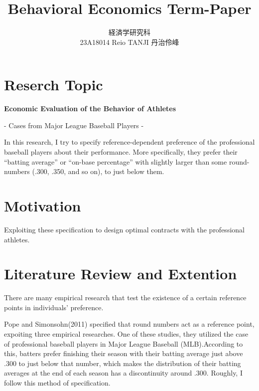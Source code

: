 \documentclass{jsarticle}[12pt]
\begin{document}
\title{Behavioral Economics Term-Paper}
\author{経済学研究科　 \\ 23A18014 Reio TANJI 丹治伶峰}
\date{}
\maketitle

\section{Reserch Topic}

\Large

\textbf{Economic Evaluation of the Behavior of Athletes}

\hspace{5zw}- Cases from Major League Baseball Players -

\large

\vspace{1zw}

\hspace{1zw}In this research, I try to specify reference-dependent preference of the professional baseball players about their performance. More specifically, they prefer their ``batting average'' or ``on-base percentage'' with slightly larger than some round-numbers (.300, .350, and so on), to just below them.

\section{Motivation}

Exploiting these specification to design optimal contracts with the professional athletes.

\section{Literature Review and Extention}

\hspace{1zw} There are many empirical research that test the existence of a certain reference points in individuals' preference.

\hspace{1zw} Pope and Simonsohn(2011) specified that round numbers act as a reference point, expoiting three empirical researches. One of these studies, they utilized the case of professional baseball players in Major League Baseball (MLB).According to this, batters prefer finishing their season with their batting average just above .300 to just below that number, which makes the distribution of their batting averages at the end of each season has a discontinuity around .300. Roughly, I follow this method of specification.
\end{document}
